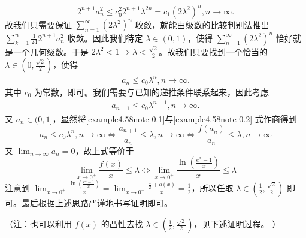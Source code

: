 \documentclass[../../main.tex]{subfiles}%
\begin{document}
\begin{note}
\[
2^{n + 1} a_n^2 \leqslant  c_0^2 2^{n + 1} \lambda ^{2n} = c_1 (2\lambda ^2)^n, n \to \infty.
\]
故我们只需要保证 \(\sum_{n = 1}^{\infty} (2\lambda ^2)^n\) 收敛，就能由级数的比较判别法推出 \(\sum_{k = 1}^n \frac{1}{24} 2^{n + 1} a_n^2\) 收敛。因此我们待定 \(\lambda \in (0, 1)\)，使得 \(\sum_{n = 1}^{\infty} (2\lambda ^2)^n\) 恰好就是一个几何级数。于是 \(2\lambda ^2 < 1 \Rightarrow \lambda < \frac{\sqrt{2}}{2}\)。故我们只要找到一个恰当的 \(\lambda \in \left(0, \frac{\sqrt{2}}{2}\right)\)，使得
\begin{align}
a_n \leqslant  c_0 \lambda ^n, n \to \infty. \label{example4.58note-0.1}
\end{align}
其中 \(c_0\) 为常数，即可。我们需要与已知的递推条件联系起来，因此考虑
\begin{align}
a_{n + 1} \leqslant  c_0 \lambda ^{n + 1}, n \to \infty. \label{example4.58note-0.2}
\end{align}
又 \(a_n \in (0, 1]\)，显然将\eqref{example4.58note-0.1}与\eqref{example4.58note-0.2} 式作商得到
\[
a_n\leqslant c_0\lambda ^n,n\rightarrow \infty \Leftrightarrow \frac{a_{n+1}}{a_n}\leqslant \lambda ,n\rightarrow \infty \Leftrightarrow \frac{f(a_n)}{a_n}\leqslant \lambda ,n\rightarrow \infty 
\]
又 \(\lim_{n \to \infty} a_n = 0\)，故上式等价于
\[
\lim_{x \to 0^+} \frac{f(x)}{x} \leqslant  \lambda \Leftrightarrow \lim_{x \to 0^+} \frac{\ln\left(\frac{e^x - 1}{x}\right)}{x} \leqslant  \lambda 
\]
注意到 \(\lim_{x \to 0^+} \frac{\ln\left(\frac{e^x - 1}{x}\right)}{x} = \lim_{x \to 0^+} \frac{\frac{x}{2}+o(x)}{x} = \frac{1}{2}\)，所以任取 \(\lambda \in \left(\frac{1}{2}, \frac{\sqrt{2}}{2}\right)\) 即可。最后根据上述思路严谨地书写证明即可。

（注：也可以利用 \(f(x)\) 的凸性去找 \(\lambda \in \left(\frac{1}{2}, \frac{\sqrt{2}}{2}\right)\)，见下述证明过程。 ）
\end{note}
\end{document}
